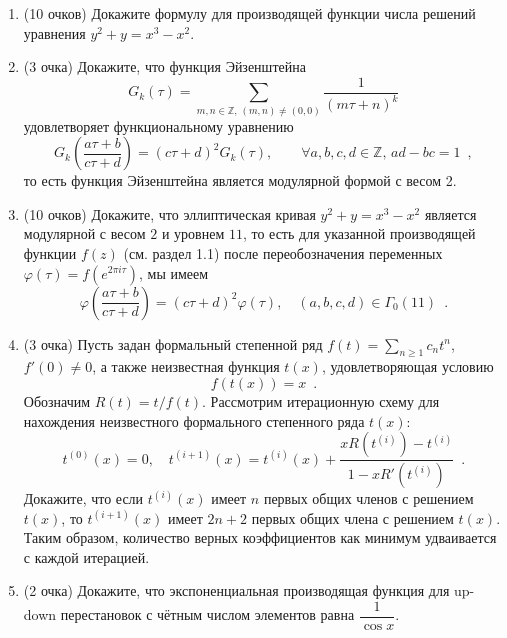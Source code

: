 \documentclass{article}
\theoremstyle{definition}
\begin{document}
\begin{enumerate}
\item(10 очков) Докажите формулу для производящей функции числа решений уравнения \( y^2 + y = x^3 - x^2 \).

\item(3 очка) Докажите, что функция Эйзенштейна
\[
	G_k(\tau) = \sum_{m,n\in \mathbb Z, \, (m,n) \neq (0,0)} \dfrac{1}{(m \tau + n)^k}
\]
удовлетворяет функциональному уравнению
\[
	G_k\left( \dfrac{a \tau + b}{c \tau + d}\right) = (c \tau + d)^2 G_k(\tau), \qquad \forall a,b,c,d \in \mathbb Z, \, ad - bc = 1 \enspace ,
\]
то есть функция Эйзенштейна является модулярной формой с весом 2.

\item(10 очков) Докажите, что эллиптическая кривая \( y^2 + y = x^3 - x^2 \) является модулярной с весом \( 2 \) и уровнем \( 11 \), то есть для указанной производящей функции \( f(z) \) (см. раздел 1.1) после переобозначения переменных \( \varphi(\tau) = f(e^{2 \pi i \tau}) \), мы имеем
\[
	\varphi \left(\dfrac{a \tau + b}{c \tau + d}\right) = (c \tau + d)^{2} \varphi (\tau), \quad
	(a,b,c,d) \in \Gamma_0(11) \enspace .
\]

\item(3 очка) Пусть задан формальный степенной ряд \( f(t) = \sum_{n \geq 1} c_n t^n \), \( f'(0) \neq 0 \), а также неизвестная функция \( t(x) \), удовлетворяющая условию
\[
	f(t(x)) = x \enspace .
\]
Обозначим \( R(t) = t / f(t) \).
Рассмотрим итерационную схему для нахождения неизвестного формального степенного ряда \( t(x) \):
\[
	t^{(0)}(x) = 0, \quad
	t^{(i+1)}(x) = t^{(i)}(x) + \dfrac{x R(t^{(i)}) - t^{(i)}}{1 - x R'(t^{(i)})} \enspace .
\]
Докажите, что если \( t^{(i)}(x) \) имеет \( n \) первых общих членов с решением \( t(x) \), то \( t^{(i+1)}(x) \) имеет \( 2n + 2 \) первых общих члена с решением \( t(x) \). Таким образом, количество верных коэффициентов как минимум удваивается с каждой итерацией.

\item(2 очка) Докажите, что экспоненциальная производящая функция для up-down перестановок с чётным числом элементов равна \( \dfrac{1}{\cos x} \).
\end{enumerate}

\footnotesize


    
\end{document}
